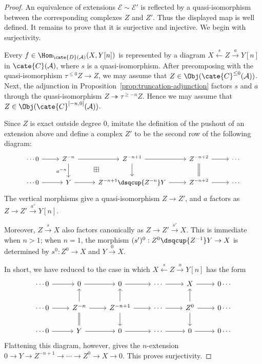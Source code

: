 \begin{proof}
	An equivalence of extensions $\mathcal{E}\sim\mathcal{E}'$ is reflected
	by a quasi-isomorphism between the corresponding complexes $Z$ and
	$Z'$. Thus the displayed map is well defined. It remains to prove that
	it is surjective and injective. We begin with surjectivity.

	Every $f\in\Hom_{\cate{D}(\mathcal{A})}(X,Y[n])$ is represented by a
	diagram $X\xleftarrow{s}Z\xrightarrow{a}Y[n]$ in
	$\cate{C}(\mathcal{A})$, where $s$ is a quasi-isomorphism. After
	precomposing with the quasi-isomorphism $\tau^{\leq0}Z\to Z$, we may
	assume that $Z\in\Obj(\cate{C}^{\leq0}(\mathcal{A}))$. Next, the
	adjunction in Proposition~\ref{prop:truncation-adjunction} factors $s$
	and $a$ through the quasi-isomorphism
	$Z\twoheadrightarrow\tau^{\geq-n}Z$. Hence we may assume that
	$Z\in\Obj(\cate{C}^{[-n,0]}(\mathcal{A}))$.

	Since $Z$ is exact outside degree $0$, imitate the definition of the
	pushout of an extension above and define a complex $Z'$ to be the
	second row of the following diagram:
	\[\begin{tikzcd}[every cell/.append style={font=\small}]
		\cdots 0 \arrow[r] & Z^{-n} \arrow[r] \arrow[d, "{a^{-n}}"'] \arrow[phantom, rd, "\boxplus" description] & Z^{-n+1} \arrow[r] \arrow[d] & Z^{-n+2} \arrow[r] \arrow[equal, d] & \cdots \\
		\cdots 0 \arrow[r] & Y \arrow[r] & Z^{-n+1} \dsqcup{Z^{-n}} Y \arrow[r] & Z^{-n+2} \arrow[r] & \cdots
	\end{tikzcd}\]
	The vertical morphisms give a quasi-isomorphism $Z\to Z'$, and $a$
	factors as $Z\to Z'\xrightarrow{a'}Y[n]$.

	Moreover, $Z\xrightarrow{s}X$ also factors canonically as
	$Z\to Z'\xrightarrow{s'}X$. This is immediate when $n>1$; when $n=1$,
	the morphism $(s')^0:Z^0\dsqcup{Z^{-1}}Y\to X$ is determined by
	$s^0:Z^0\to X$ and $Y\xrightarrow{0}X$.

	In short, we have reduced to the case in which
	$X\xleftarrow{s}Z\xrightarrow{a}Y[n]$ has the form
	\[\begin{tikzcd}
		\cdots 0 \arrow[r] & 0 \arrow[r] & 0 \arrow[r] & \cdots \arrow[r] & X \arrow[r] & 0 \cdots \\
		\cdots 0 \arrow[r] & Z^{-n} \arrow[r] \arrow[equal, d] \arrow[u] & Z^{-n+1} \arrow[r] \arrow[u] \arrow[d] & \cdots \arrow[r] & Z^0 \arrow[u] \arrow[d] \arrow[r] & 0 \cdots \\
		\cdots 0 \arrow[r] & Y \arrow[r] & 0 \arrow[r] & \cdots \arrow[r] & 0 \arrow[r] & 0 \cdots
	\end{tikzcd}\]
	Flattening this diagram, however, gives the $n$-extension
	$0\to Y\to Z^{-n+1}\to\cdots\to Z^0\to X\to0$. This proves
	surjectivity.


\end{proof}
